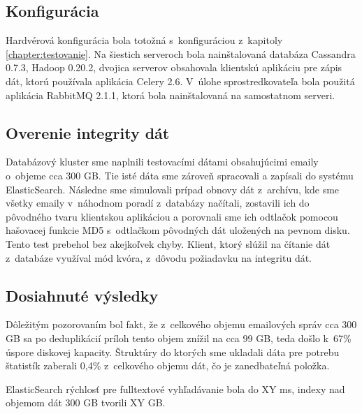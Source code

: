 \documentclass[11pt,twoside,a4paper]{book}
\begin{document}
\subsection*{Konfigurácia}
Hardvérová konfigurácia bola totožná s~konfiguráciou z~kapitoly \ref{chapter:testovanie}. Na šiestich serveroch bola nainštalovaná databáza Cassandra 0.7.3, Hadoop 0.20.2, dvojica serverov obsahovala klientskú aplikáciu pre zápis dát, ktorú používala aplikácia Celery 2.6. V~úlohe sprostredkovateľa bola použitá aplikácia RabbitMQ 2.1.1, ktorá bola nainštalovaná na samostatnom serveri.


\subsection*{Overenie integrity dát}
Databázový kluster sme naplnili testovacími dátami obsahujúcimi emaily o~objeme cca 300 GB. Tie isté dáta sme zároveň spracovali a zapísali do systému ElasticSearch. Následne sme simulovali prípad obnovy dát z~archívu, kde sme všetky emaily v~náhodnom poradí z~databázy načítali, zostavili ich do pôvodného tvaru klientskou aplikáciou a porovnali sme ich odtlačok pomocou hašovacej funkcie MD5 s~odtlačkom pôvodných dát uložených na pevnom disku. Tento test prebehol bez akejkoľvek chyby. 
Klient, ktorý slúžil na čítanie dát z~databáze využíval mód kvóra, z~dôvodu požiadavku na integritu dát.


\subsection*{Dosiahnuté výsledky}
Dôležitým pozorovaním bol fakt, že z~celkového objemu emailových správ cca 300 GB sa po deduplikácií príloh tento objem znížil na cca 99 GB, teda došlo k~67\% úspore diskovej kapacity. Štruktúry do ktorých sme ukladali dáta pre potrebu štatistík zaberali 0,4\% z~celkového objemu dát, čo je zanedbateľná položka.

\noindent
ElasticSearch rýchlosť pre fulltextové vyhľadávanie bola do XY ms, indexy nad objemom dát 300 GB tvorili XY GB.



\end{document}
